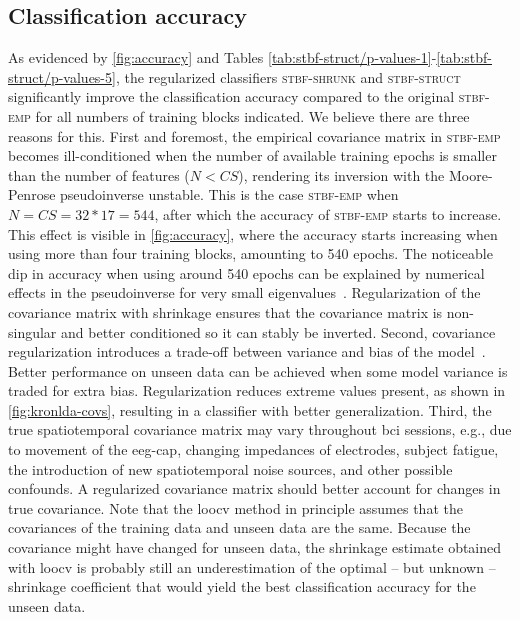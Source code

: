 	\subsection{Classification accuracy}
	As evidenced by \cref{fig:accuracy} and Tables \ref{tab:stbf-struct/p-values-1}-\ref{tab:stbf-struct/p-values-5}, the regularized classifiers \textsc{stbf-shrunk}
	and \textsc{stbf-struct} significantly improve the classification accuracy
	compared to the original \textsc{stbf-emp} for all numbers of training blocks
	indicated.
	We believe there are three reasons for this.
	First and foremost, the empirical covariance matrix in \textsc{stbf-emp} becomes
	ill-conditioned when the number of available training epochs is smaller than
	the number of features ($N<CS$), rendering its inversion with the
	Moore-Penrose pseudoinverse unstable.
	This is the case \textsc{stbf-emp} when $N=CS=32*17=544$, after which the
	accuracy of \textsc{stbf-emp} starts to increase.
	This effect is visible in \cref{fig:accuracy}, where the accuracy starts
	increasing when using more than four training blocks, amounting to 540 epochs.
	The noticeable dip in accuracy when using around 540 epochs can be explained by
	numerical effects in the pseudoinverse for very small
	eigenvalues~\cite{Blankertz2011, Raudys1998, Schaefer2004,
		Kraemer2009}.
	Regularization of the covariance matrix with shrinkage ensures that the
	covariance matrix is non-singular and better conditioned so it can stably be inverted.
	Second, covariance regularization introduces a trade-off between variance and bias of the model~\cite{Ledoit2004}.
	Better performance on unseen data can be achieved when some model variance is
	traded for extra bias.
	Regularization reduces extreme values present, as shown in
	\cref{fig:kronlda-covs}, resulting in a classifier with
	better generalization.
	Third, the true spatiotemporal covariance matrix may vary throughout \ac{bci}
	sessions, e.g., due to movement of the \ac{eeg}-cap, changing impedances of
	electrodes, subject fatigue, the introduction of new spatiotemporal noise
	sources, and other possible confounds.
	A regularized covariance matrix should better account for changes in true covariance.
	Note that the \ac{loocv} method in principle assumes that the covariances of
	the training data and unseen data are the same.
	Because the covariance might have changed for unseen data, the shrinkage
	estimate obtained with \ac{loocv} is probably still an
	underestimation of the optimal -- but unknown -- shrinkage coefficient that
	would yield the best classification accuracy for the unseen data.

